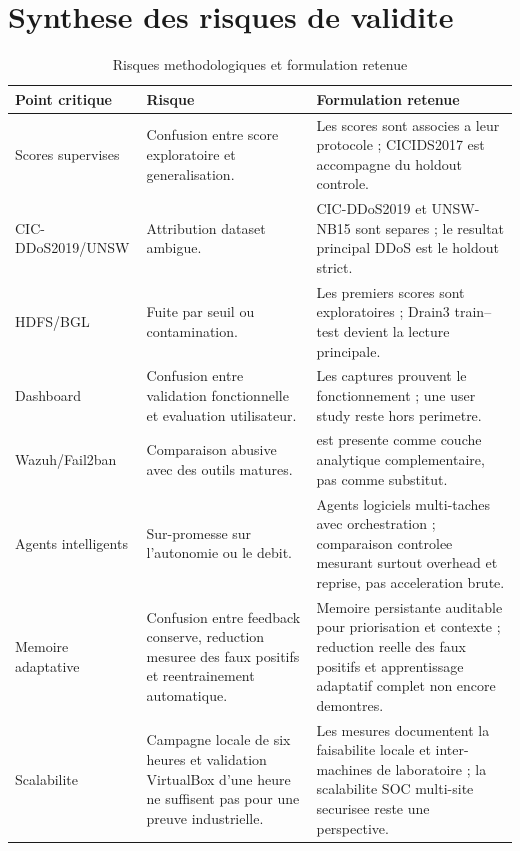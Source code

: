 \section{Synthese des risques de validite}
\begin{table}[H]
\centering
\caption{Risques methodologiques et formulation retenue}
\label{tab:risques-methodologiques}
\scriptsize
\begin{tabularx}{\textwidth}{p{3.2cm}p{4.2cm}X}
\toprule
\textbf{Point critique} & \textbf{Risque} & \textbf{Formulation retenue} \\
\midrule
Scores supervises & Confusion entre score exploratoire et generalisation. & Les scores sont associes a leur protocole ; CICIDS2017 est accompagne du holdout controle. \\
CIC-DDoS2019/UNSW & Attribution dataset ambigue. & CIC-DDoS2019 et UNSW-NB15 sont separes ; le resultat principal DDoS est le holdout strict. \\
HDFS/BGL & Fuite par seuil ou contamination. & Les premiers scores sont exploratoires ; Drain3 train--test devient la lecture principale. \\
Dashboard & Confusion entre validation fonctionnelle et evaluation utilisateur. & Les captures prouvent le fonctionnement ; une user study reste hors perimetre. \\
Wazuh/Fail2ban & Comparaison abusive avec des outils matures. & \logminer{} est presente comme couche analytique complementaire, pas comme substitut. \\
Agents intelligents & Sur-promesse sur l'autonomie ou le debit. & Agents logiciels multi-taches avec orchestration ; comparaison controlee mesurant surtout overhead et reprise, pas acceleration brute. \\
Memoire adaptative & Confusion entre feedback conserve, reduction mesuree des faux positifs et reentrainement automatique. & Memoire persistante auditable pour priorisation et contexte ; reduction reelle des faux positifs et apprentissage adaptatif complet non encore demontres. \\
Scalabilite & Campagne locale de six heures et validation VirtualBox d'une heure ne suffisent pas pour une preuve industrielle. & Les mesures documentent la faisabilite locale et inter-machines de laboratoire ; la scalabilite SOC multi-site securisee reste une perspective. \\
\bottomrule
\end{tabularx}
\end{table}

